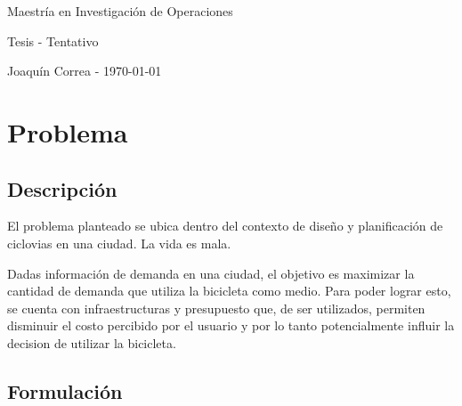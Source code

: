\documentclass{article}
\begin{document}
  \begin{center}
    {\sc \large Maestría en Investigación de Operaciones}
    
    {\sc \large Tesis - Tentativo}
    \linebreak

    {\rm Joaquín Correa - \today}
  \end{center}

  \section*{Problema}

  \subsection*{Descripción}

  El problema planteado se ubica dentro del contexto de diseño y planificación de ciclovias en una ciudad. La vida es mala.

  Dadas información de demanda en una ciudad, el objetivo es maximizar la cantidad de demanda que utiliza la bicicleta como medio. Para poder lograr esto, se cuenta con infraestructuras y presupuesto que, de ser utilizados, permiten disminuir el costo percibido por el usuario y por lo tanto potencialmente influir la decision de utilizar la bicicleta.

  \subsection*{Formulación}

  
\end{document}
